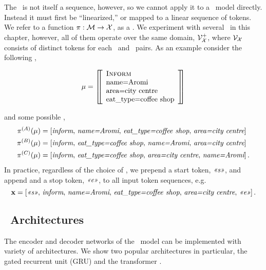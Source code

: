 The \meaningrepresentation~is not 
itself a sequence, however, so we cannot apply it to a 
\sequencetosequence~model
directly.
 Instead it must first be ``linearized,'' or mapped to a linear sequence of 
 tokens. We refer to a function $\pi : \mathcal{M} \rightarrow \mathcal{X}$,
 as a \linearizationstrategy. We experiment with several 
 \linearizationstrategies~in this chapter, however, all of them operate over
 the same {\color{red}domain}, $\mathcal{V}_{\mathcal{X}}^+$, where $\mathcal{V}_{\mathcal{X}}$ consists of 
 distinct tokens for each \dialogueact~and \attributevalue~pairs. As an example
 consider the following \meaningrepresentation,
 \begin{singlespace}
  \[ \mu = \left[\!\!\left[\begin{array}{l} \textsc{Inform} \\ \textrm{name=Aromi}\\\textrm{area=city centre} \\ \textrm{eat\_type=coffee shop} \end{array}\right]\!\!\right] \]
 \end{singlespace}
\noindent and some possible \linearizationstrategies,
 \begin{align*}
     \pi^{(A)}(\mu) & =  \left[\textit{inform},\,\textit{name=Aromi},\,\textit{eat\_type=coffee shop},\,\textit{area=city centre}\right] \\
     \pi^{(B)}(\mu) & =  \left[\textit{inform},\,\textit{eat\_type=coffee shop},\,\textit{name=Aromi},\,\textit{area=city centre}\right] \\
     \pi^{(C)}(\mu) & =  \left[\textit{inform},\,\textit{eat\_type=coffee shop},\,\textit{area=city centre},\,\textit{name=Aromi}\right].
 \end{align*}
In practice, regardless of the choice of \linearizationstrategy, we prepend a start token, $\textit{<<s>>}$,
and append and a stop token, $\textit{<<e>>}$, to all input token sequences, e.g.
\[ \mathbf{x} = \left[\textit{<<s>>},\,\textit{inform},\,\textit{name=Aromi},\,\textit{eat\_type=coffee shop},\,\textit{area=city centre},\,\textit{<<e>>}\right]. \]


\subsection{\SequencetoSequence~Architectures}

The encoder and decoder networks of the \sequencetosequence~model can be implemented with variety
of architectures. We show two popular architectures in particular, the gated recurrent unit (GRU)
\cite{cho} and the transformer \cite{vaswani}.

